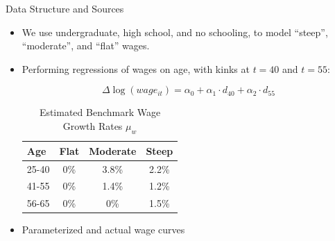 \documentclass{beamer}
\begin{document}
\begin{frame}[allowframebreaks]{Data Structure and Sources}
\begin{itemize}
\framebreak
	\item We use undergraduate, high school, and no schooling, to model ``steep'', ``moderate'', and ``flat'' wages.
	\item Performing regressions of wages on age, with kinks at $t=40$ and $t=55$:

\begin{equation}
	\Delta \log (wage_{it}) = \alpha_0 + \alpha_1 \cdot d_{40} + \alpha_2 \cdot d_{55}
\end{equation}

\begin{table}
	\centering
	\caption{Estimated Benchmark Wage Growth Rates $\mu_w$}
	\begin{tabular}[c]{l|ccc}
		Age&Flat&Moderate&Steep\\
		\hline
		25-40&0\%&3.8\%&2.2\%\\
		41-55&0\%&1.4\%&1.2\%\\
		56-65&0\%&0\%&1.5\%\\
	\end{tabular}
\end{table}

\framebreak

	\item Parameterized and actual wage curves


\end{itemize}
\end{frame}
\end{document}
